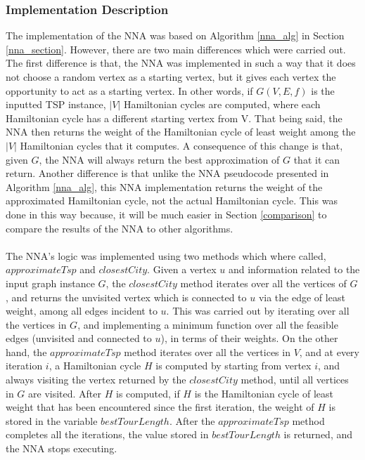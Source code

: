 \documentclass[12pt]{article}
\numberwithin{equation}{subsection}
\numberwithin{table}{subsection}
\numberwithin{algorithm}{subsection}
\numberwithin{figure}{subsection}
\begin{document}
\subsubsection{Implementation Description}
\label{NNA_impl}
The implementation of the NNA was based on Algorithm \ref{nna_alg} in Section \ref{nna_section}. However, there are two main differences which were carried out. The first difference is that, the NNA was implemented in such a way that it does not choose a random vertex as a starting vertex, but it gives each vertex the opportunity to act as a starting vertex. In other words, if $G(V,E,f)$ is the inputted TSP instance, $|V|$ Hamiltonian cycles are computed, where each Hamiltonian cycle has a different starting vertex from V. That being said, the NNA then returns the weight of the Hamiltonian cycle of least weight among the $|V|$ Hamiltonian cycles that it computes. A consequence of this change is that, given $G$, the NNA will always return the best approximation of $G$ that it can return. Another difference is that unlike the NNA pseudocode presented in Algorithm \ref{nna_alg}, this NNA implementation returns the weight of the approximated Hamiltonian cycle, not the actual Hamiltonian cycle. This was done in this way because, it will be much easier in Section \ref{comparison} to compare the results of the NNA to other algorithms.\\\\
The NNA's logic was implemented using two methods which where called, $approximateTsp$ and $closestCity$. Given a vertex $u$ and information related to the input graph instance $G$, the $closestCity$ method iterates over all the vertices of $G$, and returns the unvisited vertex which is connected to $u$ via the edge of least weight, among all edges incident to $u$. This was carried out by iterating over all the vertices in $G$, and implementing a minimum function over all the feasible edges (unvisited and connected to $u$), in terms of their weights. On the other hand, the $approximateTsp$ method iterates over all the vertices in $V$, and at every iteration $i$, a Hamiltonian cycle $H$ is computed by starting from vertex $i$, and always visiting the vertex returned by the $closestCity$ method, until all vertices in $G$ are visited. After $H$ is computed, if $H$ is the Hamiltonian cycle of least weight that has been encountered since the first iteration, the weight of $H$ is stored in the variable $bestTourLength$. After the $approximateTsp$ method completes all the iterations, the value stored in $bestTourLength$ is returned, and the NNA stops executing.\\\\
\end{document}
